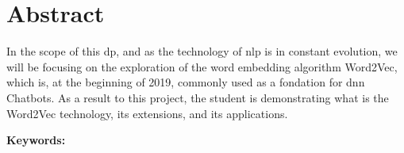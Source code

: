 \chapter*{Abstract}

In the scope of this \gls{dp}, and as the technology of \acrshort{nlp} is in constant evolution, we will be focusing on the exploration of the word embedding algorithm Word2Vec, which is, at the beginning of 2019, commonly used as a fondation for \acrshort{dnn} Chatbots. As a result to this project, the student is demonstrating what is the Word2Vec technology, its extensions, and its applications.

\vskip0.5cm
\textbf{Keywords:} 
\Keywords